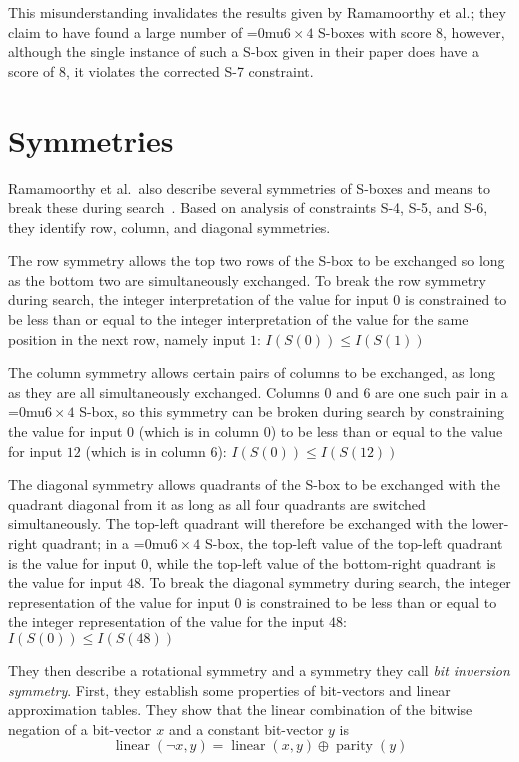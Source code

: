\documentclass[a4paper,10pt,twoside,openright]{book}
\newcommand*\sixbyfour{\begingroup\medmuskip=0mu\relax$6 \times 4$\endgroup}
\DeclareMathOperator{\parity}{parity}
\DeclareMathOperator{\lin}{linear}
\begin{document}
This misunderstanding invalidates the results given by Ramamoorthy et al.; 
they claim to have found a large number of \sixbyfour{} S-boxes with score $8$, however,
although the single instance of such a S-box given in their paper does have a score of $8$,
it violates the corrected S-7 constraint.

\section{Symmetries}
\label{sec:symmetries}

Ramamoorthy et al.\ also describe several symmetries of S-boxes and means to break these during search~\cite{sboxsymmetry}.
Based on analysis of constraints S-4, S-5, and S-6, they identify row, column, and diagonal symmetries.

The row symmetry allows the top two rows of the S-box to be exchanged so long as the bottom two are simultaneously exchanged.
To break the row symmetry during search, the integer interpretation of the value for input $0$ is constrained 
to be less than or equal to the integer interpretation of the value for the same position in the next row, namely input $1$:
$I(S(0)) \leq I(S(1))$

The column symmetry allows certain pairs of columns to be exchanged, as long as they are all simultaneously exchanged.
Columns $0$ and $6$ are one such pair in a \sixbyfour{} S-box, 
so this symmetry can be broken during search by constraining the 
value for input $0$ (which is in column 0) to be less than or equal to the 
value for input $12$ (which is in column $6$):
$I(S(0)) \leq I(S(12))$

The diagonal symmetry allows quadrants of the S-box to be exchanged with the quadrant diagonal from it 
as long as all four quadrants are switched simultaneously.
The top-left quadrant will therefore be exchanged with the lower-right quadrant;
in a \sixbyfour{} S-box, the top-left value of the top-left quadrant is the 
value for input $0$, while the top-left value of the bottom-right quadrant
is the value for input $48$.
To break the diagonal symmetry during search, 
the integer representation of
the value for input $0$ is constrained
to be less than or equal to 
the integer representation of
the value for the input $48$:
$I(S(0)) \leq I(S(48))$

They then describe a rotational symmetry and a symmetry they call \textit{bit inversion symmetry}.
First, they establish some properties of bit-vectors and linear approximation tables. 
They show that the linear combination of the bitwise negation of a bit-vector $x$ and a constant bit-vector $y$ is
\[\lin(\lnot x, y) = \lin(x,y) \oplus \parity(y)\]
\end{document}

